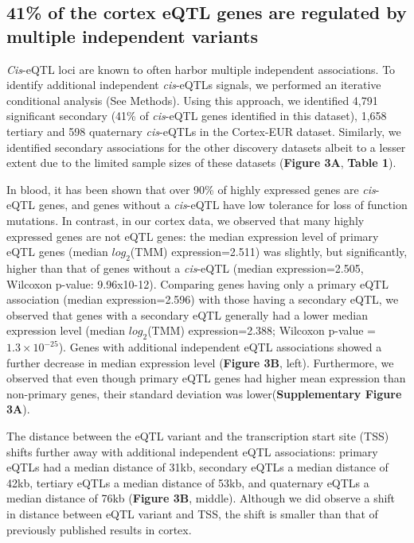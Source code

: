 {{\subsection{41\% of the cortex eQTL genes are regulated by multiple independent variants}
\emph{Cis}-eQTL loci are known to often harbor multiple independent associations\cite{aguetGeneticEffectsGene2017,zhernakovaIdentificationContextdependentExpression2017,vosaUnravelingPolygenicArchitecture2018}. To identify additional independent \emph{cis}-eQTLs signals, we performed an iterative conditional analysis (See Methods). Using this approach, we identified 4,791 significant secondary (41\% of \emph{cis}-eQTL genes identified in this dataset), 1,658 tertiary and 598 quaternary \emph{cis}-eQTLs in the Cortex-EUR dataset. Similarly, we identified secondary associations for the other discovery datasets albeit to a lesser extent due to the limited sample sizes of these datasets (\textbf{Figure 3A}, \textbf{Table 1}).  

In blood, it has been shown that over 90\% of highly expressed genes are \emph{cis}-eQTL genes, and genes without a \emph{cis}-eQTL have low tolerance for loss of function mutations\cite{vosaUnravelingPolygenicArchitecture2018}. In contrast, in our cortex data, we observed that many highly expressed genes are not eQTL genes: the median expression level of primary eQTL genes (median $log_2$(TMM) expression=2.511) was slightly, but significantly, higher than that of genes without a \emph{cis}-eQTL (median expression=2.505, Wilcoxon p-value: 9.96x10-12). Comparing genes having only a primary eQTL association (median expression=2.596) with those having a secondary eQTL, we observed that genes with a secondary eQTL generally had a lower median expression level (median $log_2$(TMM) expression=2.388; Wilcoxon p-value = $1.3 \times 10^{-25}$). Genes with additional independent eQTL associations showed a further decrease in median expression level (\textbf{Figure 3B}, left). Furthermore, we observed that even though primary eQTL genes had higher mean expression than non-primary genes, their standard deviation was lower(\textbf{Supplementary Figure 3A}). 

The distance between the eQTL variant and the transcription start site (TSS) shifts further away with additional independent eQTL associations: primary eQTLs had a median distance of 31kb, secondary eQTLs a median distance of 42kb, tertiary eQTLs a median distance of 53kb, and quaternary eQTLs a median distance of 76kb (\textbf{Figure 3B}, middle). Although we did observe a shift in distance between eQTL variant and TSS, the shift is smaller than that of previously published results in cortex\cite{dobbynLandscapeConditionalEQTL2018}.  

}}
